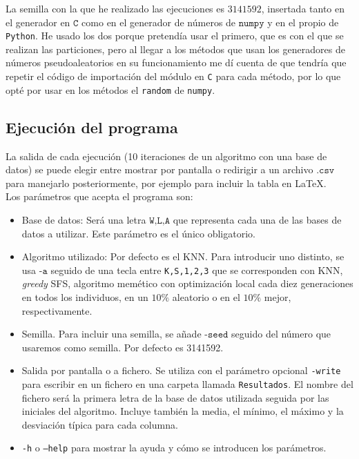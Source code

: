 \documentclass[11pt,leqno]{article}
\begin{document}
	La semilla con la que he realizado las ejecuciones es $3141592$, insertada tanto en el generador en $\texttt{C}$ como en el generador de números de $\texttt{numpy}$ y en el propio de \texttt{Python}. He usado los dos porque pretendía usar el primero, que es con el que se realizan las particiones, pero al llegar a los métodos que usan los generadores de números pseudoaleatorios en su funcionamiento me dí cuenta de que tendría que repetir el código de importación del módulo en \texttt{C} para cada método, por lo que opté por usar en los métodos el \texttt{random} de \texttt{numpy}. 
	
\subsection{Ejecución del programa}
La salida de cada ejecución (10 iteraciones de un algoritmo con una base de datos) se puede elegir entre mostrar por pantalla o redirigir a un archivo $\texttt{.csv}$ para manejarlo posteriormente, por ejemplo para incluir la tabla en \LaTeX.\\
Los parámetros que acepta el programa son:
\begin{itemize}
\item Base de datos: Será una letra $\texttt{W,L,A}$ que representa cada una de las bases de datos a utilizar. Este parámetro es el único obligatorio.
\item Algoritmo utilizado: Por defecto es el KNN. Para introducir uno distinto, se usa $\texttt{-a}$ seguido de una tecla entre \texttt{K,S,1,2,3} que se corresponden con KNN, \textit{greedy} SFS, algoritmo memético con optimización local cada diez generaciones en todos los individuos, en un $10\%$ aleatorio o en el $10\%$ mejor, respectivamente.
\item Semilla. Para incluir una semilla, se añade $\texttt{-seed}$ seguido del número que usaremos como semilla. Por defecto es 3141592.
\item Salida por pantalla o a fichero. Se utiliza con el parámetro opcional \texttt{-write} para escribir en un fichero en una carpeta llamada \texttt{Resultados}. El nombre del fichero será la primera letra de la base de datos utilizada seguida por las iniciales del algoritmo. Incluye también la media, el mínimo, el máximo y la desviación típica para cada columna.
\item \texttt{-h} o \texttt{--help} para mostrar la ayuda y cómo se introducen los parámetros.
\end{itemize}
\end{document}
